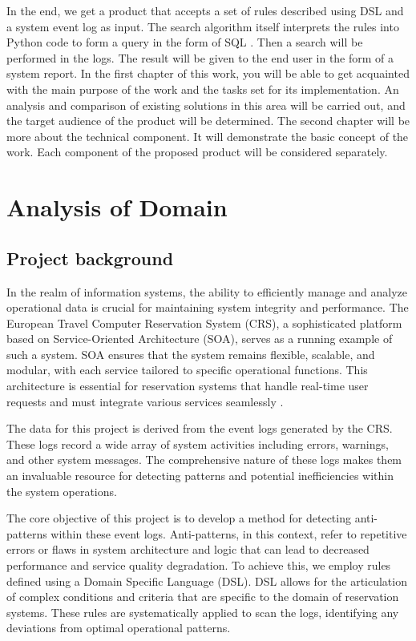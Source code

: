 \documentclass[12pt, times]{article}
\begin{document}
	\hspace*{5mm}In the end, we get a product that accepts a set of rules described using DSL and a system event log as input. The search algorithm itself interprets the rules into Python code to form a query in the form of SQL \cite{sql}. Then a search will be performed in the logs. The result will be given to the end user in the form of a system report. In the first chapter of this work, you will be able to get acquainted with the main purpose of the work and the tasks set for its implementation. An analysis and comparison of existing solutions in this area will be carried out, and the target audience of the product will be determined. The second chapter will be more about the technical component. It will demonstrate the basic concept of the work. Each component of the proposed product will be considered separately.
\clearpage



\section{Analysis of Domain}
\subsection{Project background}
	\hspace*{5mm}In the realm of information systems, the ability to efficiently manage and analyze operational data is crucial for maintaining system integrity and performance. The European Travel Computer Reservation System (CRS), a sophisticated platform based on Service-Oriented Architecture (SOA), serves as a running example of such a system. SOA ensures that the system remains flexible, scalable, and modular, with each service tailored to specific operational functions. This architecture is essential for reservation systems that handle real-time user requests and must integrate various services seamlessly \cite{soa_2}.

	\hspace*{5mm}The data for this project is derived from the event logs generated by the CRS. These logs record a wide array of system activities including errors, warnings, and other system messages. The comprehensive nature of these logs makes them an invaluable resource for detecting patterns and potential inefficiencies within the system operations.

	\hspace*{5mm}The core objective of this project is to develop a method for detecting anti-patterns within these event logs. Anti-patterns, in this context, refer to repetitive errors or flaws in system architecture and logic that can lead to decreased performance and service quality degradation. To achieve this, we employ rules defined using a Domain Specific Language (DSL). DSL allows for the articulation of complex conditions and criteria that are specific to the domain of reservation systems. These rules are systematically applied to scan the logs, identifying any deviations from optimal operational patterns.
\end{document}
